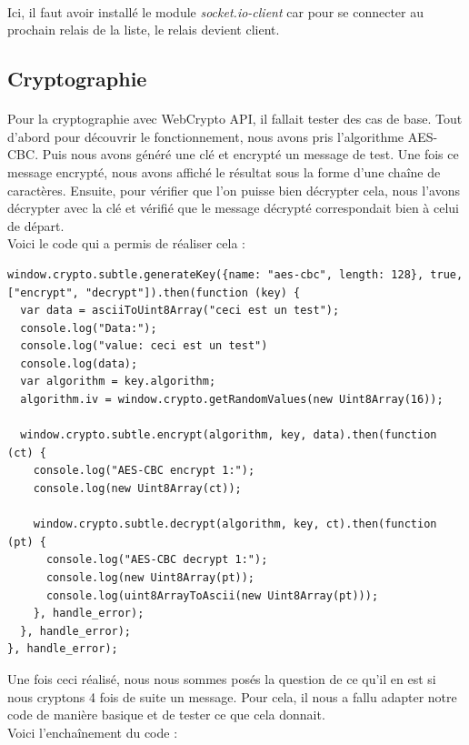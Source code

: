\documentclass[a4paper,12pt]{report}
\begin{document}
	\paragraph*{}
	Ici, il faut avoir installé le module \emph{socket.io-client} car pour se connecter au prochain relais de la liste, le relais devient client.
		 
	
	\subsection{Cryptographie}
	\paragraph*{}
	Pour la cryptographie avec WebCrypto API, il fallait tester des cas de base. Tout d'abord pour découvrir le fonctionnement, nous avons pris l'algorithme AES-CBC. Puis nous avons généré une clé et encrypté un message de test. Une fois ce message encrypté, nous avons affiché le résultat sous la forme d'une chaîne de caractères. Ensuite, pour vérifier que l'on puisse bien décrypter cela, nous l'avons décrypter avec la clé et vérifié que le message décrypté correspondait bien à celui de départ.\\
	Voici le code qui a permis de réaliser cela :
	\begin{lstlisting}
window.crypto.subtle.generateKey({name: "aes-cbc", length: 128}, true, ["encrypt", "decrypt"]).then(function (key) {
  var data = asciiToUint8Array("ceci est un test");
  console.log("Data:");
  console.log("value: ceci est un test")
  console.log(data);
  var algorithm = key.algorithm;
  algorithm.iv = window.crypto.getRandomValues(new Uint8Array(16));

  window.crypto.subtle.encrypt(algorithm, key, data).then(function (ct) {
    console.log("AES-CBC encrypt 1:");
    console.log(new Uint8Array(ct));

    window.crypto.subtle.decrypt(algorithm, key, ct).then(function (pt) {
      console.log("AES-CBC decrypt 1:");
      console.log(new Uint8Array(pt));
      console.log(uint8ArrayToAscii(new Uint8Array(pt)));
    }, handle_error);
  }, handle_error);
}, handle_error);
	\end{lstlisting}
	Une fois ceci réalisé, nous nous sommes posés la question de ce qu'il en est si nous cryptons 4 fois de suite un message. Pour cela, il nous a fallu adapter notre code de manière basique et de tester ce que cela donnait.\\
	Voici l'enchaînement du code : 
\end{document}
